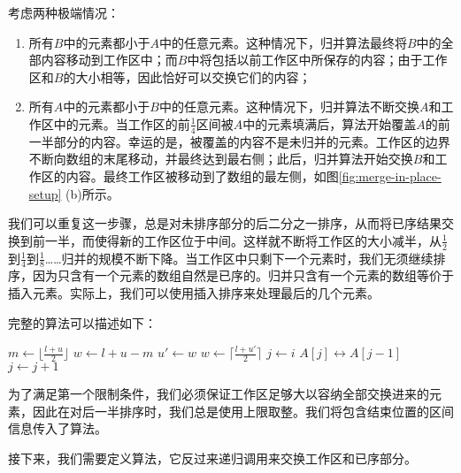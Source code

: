 \documentclass[UTF8]{article}
\begin{document}
考虑两种极端情况：

\begin{enumerate}
\item 所有$B$中的元素都小于$A$中的任意元素。这种情况下，归并算法最终将$B$中的全部内容移动到工作区中；而$B$中将包括以前工作区中所保存的内容；由于工作区和$B$的大小相等，因此恰好可以交换它们的内容；
\item 所有$A$中的元素都小于$B$中的任意元素。这种情况下，归并算法不断交换$A$和工作区中的元素。当工作区的前$\frac{1}{4}$区间被$A$中的元素填满后，算法开始覆盖$A$的前一半部分的内容。幸运的是，被覆盖的内容不是未归并的元素。工作区的边界不断向数组的末尾移动，并最终达到最右侧；此后，归并算法开始交换$B$和工作区的内容。最终工作区被移动到了数组的最左侧，如图\ref{fig:merge-in-place-setup} (b)所示。
\end{enumerate}

我们可以重复这一步骤，总是对未排序部分的后二分之一排序，从而将已序结果交换到前一半，而使得新的工作区位于中间。这样就不断将工作区的大小减半，从$\frac{1}{2}$到$\frac{1}{4}$到$\frac{1}{8}$……归并的规模不断下降。当工作区中只剩下一个元素时，我们无须继续排序，因为只含有一个元素的数组自然是已序的。归并只含有一个元素的数组等价于插入元素。实际上，我们可以使用插入排序来处理最后的几个元素。

完整的算法可以描述如下：

\begin{algorithmic}[1]
    \State $m \gets \lfloor \frac{l + u}{2} \rfloor$
    \State $w \gets l + u - m$
    \State {} 
      \State $u' \gets w$
      \State $w \gets \lceil \frac{l + u'}{2} \rceil$ 
      \State {} 
      \State {}
    \EndWhile
     
      \State $j \gets i$
        \State {} $A[j] \leftrightarrow A[j-1]$
        \State $j \gets j + 1$
      \EndWhile
    \EndFor
  \EndIf
\EndProcedure
\end{algorithmic}

为了满足第一个限制条件，我们必须保证工作区足够大以容纳全部交换进来的元素，因此在对后一半排序时，我们总是使用上限取整。我们将包含结束位置的区间信息传入了算法。

接下来，我们需要定义算法，它反过来递归调用来交换工作区和已序部分。
\end{document}
